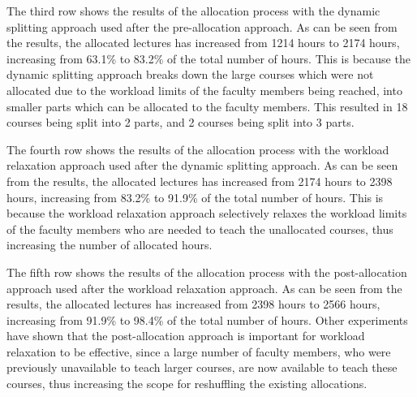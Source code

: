 The third row shows the results of the allocation process with the dynamic splitting approach used after the pre-allocation approach. As can be seen from the results, the allocated lectures has increased from 1214 hours to 2174 hours, increasing from 63.1\% to 83.2\% of the total number of hours. This is because the dynamic splitting approach breaks down the large courses which were not allocated due to the workload limits of the faculty members being reached, into smaller parts which can be allocated to the faculty members. This resulted in 18 courses being split into 2 parts, and 2 courses being split into 3 parts.

The fourth row shows the results of the allocation process with the workload relaxation approach used after the dynamic splitting approach. As can be seen from the results, the allocated lectures has increased from 2174 hours to 2398 hours, increasing from 83.2\% to 91.9\% of the total number of hours. This is because the workload relaxation approach selectively relaxes the workload limits of the faculty members who are needed to teach the unallocated courses, thus increasing the number of allocated hours.

The fifth row shows the results of the allocation process with the post-allocation approach used after the workload relaxation approach. As can be seen from the results, the allocated lectures has increased from 2398 hours to 2566 hours, increasing from 91.9\% to 98.4\% of the total number of hours. Other experiments have shown that the post-allocation approach is important for workload relaxation to be effective, since a large number of faculty members, who were previously unavailable to teach larger courses, are now available to teach these courses, thus increasing the scope for reshuffling the existing allocations.

